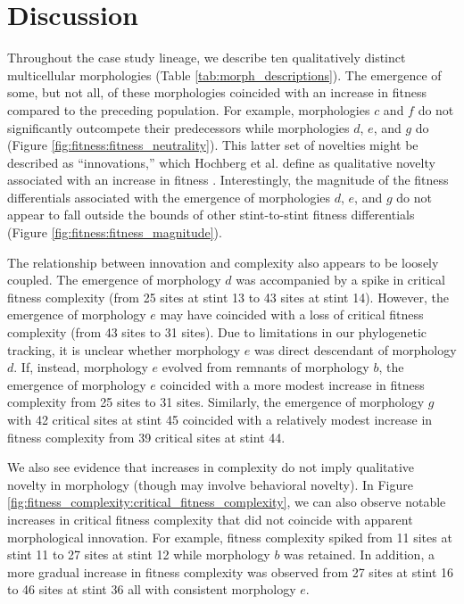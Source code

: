 \section{Discussion}

Throughout the case study lineage, we describe ten qualitatively distinct multicellular morphologies (Table \ref{tab:morph_descriptions}).
The emergence of some, but not all, of these morphologies coincided with an increase in fitness compared to the preceding population.
For example, morphologies $c$ and $f$ do not significantly outcompete their predecessors while morphologies $d$, $e$, and $g$ do (Figure \ref{fig:fitness:fitness_neutrality}).
This latter set of novelties might be described as ``innovations,'' which Hochberg et al. define as qualitative novelty associated with an increase in fitness \citep{hochberg2017innovation}.
Interestingly, the magnitude of the fitness differentials associated with the emergence of morphologies $d$, $e$, and $g$ do not appear to fall outside the bounds of other stint-to-stint fitness differentials (Figure \ref{fig:fitness:fitness_magnitude}).

The relationship between innovation and complexity also appears to be loosely coupled.
The emergence of morphology $d$ was accompanied by a spike in critical fitness complexity (from 25 sites at stint 13 to 43 sites at stint 14).
However, the emergence of morphology $e$ may have coincided with a loss of critical fitness complexity (from 43 sites to 31 sites).
Due to limitations in our phylogenetic tracking, it is unclear whether morphology $e$ was direct descendant of morphology $d$.
If, instead, morphology $e$ evolved from remnants of morphology $b$, the emergence of morphology $e$ coincided with a more modest increase in fitness complexity from 25 sites to 31 sites.
Similarly, the emergence of morphology $g$ with 42 critical sites at stint 45 coincided with a relatively modest increase in fitness complexity from 39 critical sites at stint 44.

We also see evidence that increases in complexity do not imply qualitative novelty in morphology (though may involve behavioral novelty).
In Figure \ref{fig:fitness_complexity:critical_fitness_complexity}, we can also observe notable increases in critical fitness complexity that did not coincide with apparent morphological innovation.
For example, fitness complexity spiked from 11 sites at stint 11 to 27 sites at stint 12 while morphology $b$ was retained.
In addition, a more gradual increase in fitness complexity was observed from 27 sites at stint 16 to 46 sites at stint 36 all with consistent morphology $e$.

